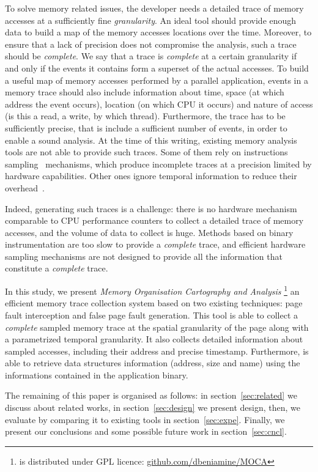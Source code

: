 To solve memory related issues, the developer needs a detailed trace of memory
accesses at a sufficiently fine \emph{granularity}.
An ideal tool should provide enough data to build a map of the memory accesses locations over the time.
Moreover, to ensure that a lack of precision
does not compromise the analysis, such a trace should be \emph{complete}. We say that a trace is
\emph{complete} at a certain granularity if and only if the events it contains
form a superset of the actual accesses. To build a useful map of memory accesses performed by a parallel application, 
events in a memory trace should also
include information about time, space (at which address the event occurs),
location (on which CPU it occurs) and nature of access (is this
a read, a write, by which thread).
Furthermore, the trace has to be sufficiently precise, that is include a sufficient number of events, in order to enable a sound analysis.
At the time of this writing, existing memory analysis tools are not able to provide such traces.
Some of them rely on instructions sampling~\cite{Liu14Tool,Lachaize12MemProf}
mechanisms, which produce incomplete traces at a precision limited by hardware capabilities. Other ones ignore temporal information to reduce their
overhead~\cite{Beniamine15TABARNACRR}.

Indeed, generating such traces is a challenge: there is no hardware mechanism
comparable to CPU performance counters to collect a detailed trace of memory accesses, and the volume
of data to collect is huge. Methods based on binary instrumentation are too slow
to provide a \emph{complete} trace, and efficient hardware sampling mechanisms are not designed
to provide all the information that constitute a \emph{complete} trace.

In this study, we present \emph{Memory Organisation Cartography and Analysis}
\footnote{\Moca is distributed under GPL licence:
    \href{https://github.com/dbeniamine/MOCA}{github.com/dbeniamine/MOCA}}
an efficient memory trace collection system based on two existing techniques:
page fault interception and false page fault generation.
This tool is able to collect a \emph{complete} sampled memory trace at
the spatial granularity of the page along with a parametrized temporal granularity.
It also collects detailed information about sampled accesses, including their address and
precise timestamp. Furthermore, \Moca is able to retrieve data structures
information (address, size and name) using the informations contained in the application binary.

The remaining of this paper is organised as follows: in section~\ref{sec:related}
we discuss about related works, in section~\ref{sec:design} we present \Moca design, then,
we evaluate \Moca by comparing it to existing tools in section~\ref{sec:expe}.
Finally, we present our conclusions and some possible future work in
section~\ref{sec:cncl}.
